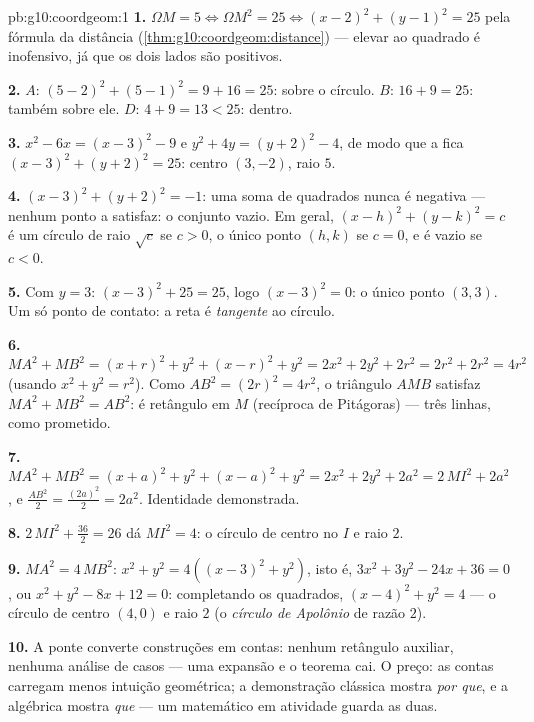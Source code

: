 \begin{solution}{pb:g10:coordgeom:1}
\textbf{1.} $\Omega M = 5 \iff \Omega M^2 = 25 \iff
(x - 2)^2 + (y - 1)^2 = 25$ pela fórmula da distância
(\cref{thm:g10:coordgeom:distance}) --- elevar ao quadrado é
inofensivo, já que os dois lados são positivos.

\textbf{2.} $A$: $(5-2)^2 + (5-1)^2 = 9 + 16 = 25$: sobre o
círculo. $B$: $16 + 9 = 25$: também sobre ele. $D$:
$4 + 9 = 13 < 25$: dentro.

\textbf{3.} $x^2 - 6x = (x - 3)^2 - 9$ e
$y^2 + 4y = (y + 2)^2 - 4$, de modo que a  fica
$(x - 3)^2 + (y + 2)^2 = 25$: centro $(3, -2)$, raio $5$.

\textbf{4.} $(x - 3)^2 + (y + 2)^2 = -1$: uma soma de quadrados
nunca é negativa --- nenhum ponto a satisfaz: o conjunto vazio.
Em geral, $(x - h)^2 + (y - k)^2 = c$ é um círculo de raio
$\sqrt c$ se $c > 0$, o único ponto $(h, k)$ se $c = 0$, e é
vazio se $c < 0$.

\textbf{5.} Com $y = 3$: $(x - 3)^2 + 25 = 25$, logo
$(x - 3)^2 = 0$: o único ponto $(3, 3)$. Um só ponto de
contato: a reta é \emph{tangente} ao círculo.

\textbf{6.} $MA^2 + MB^2 = (x + r)^2 + y^2 + (x - r)^2 + y^2
= 2x^2 + 2y^2 + 2r^2 = 2r^2 + 2r^2 = 4r^2$ (usando
$x^2 + y^2 = r^2$). Como $AB^2 = (2r)^2 = 4r^2$, o triângulo
$AMB$ satisfaz $MA^2 + MB^2 = AB^2$: é retângulo em $M$
(recíproca de Pitágoras) --- três linhas, como prometido.

\textbf{7.} $MA^2 + MB^2 = (x + a)^2 + y^2 + (x - a)^2 + y^2
= 2x^2 + 2y^2 + 2a^2 = 2\,MI^2 + 2a^2$, e
$\frac{AB^2}{2} = \frac{(2a)^2}{2} = 2a^2$. Identidade
demonstrada.

\textbf{8.} $2\,MI^2 + \frac{36}{2} = 26$ dá $MI^2 = 4$: o
círculo de centro no  $I$ e raio $2$.

\textbf{9.} $MA^2 = 4\,MB^2$:
$x^2 + y^2 = 4\left((x - 3)^2 + y^2\right)$, isto é,
$3x^2 + 3y^2 - 24x + 36 = 0$, ou
$x^2 + y^2 - 8x + 12 = 0$: completando os quadrados,
$(x - 4)^2 + y^2 = 4$ --- o círculo de centro $(4, 0)$ e raio
$2$ (o \emph{círculo de Apolônio} de razão $2$).

\textbf{10.} A ponte converte construções em contas: nenhum
retângulo auxiliar, nenhuma análise de casos --- uma expansão e
o teorema cai. O preço: as contas carregam menos intuição
geométrica; a demonstração clássica mostra \emph{por que}, e a
algébrica mostra \emph{que} --- um matemático em atividade
guarda as duas.


\end{solution}
